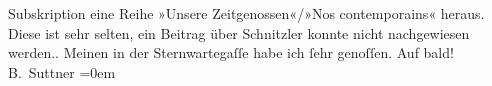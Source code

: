 \begin{ledgroupsized}[t]{13cm}
{{{                        Subskription eine Reihe »Unsere Zeitgenossen«/»Nos contemporains« heraus.
                        Diese ist sehr selten, ein Beitrag über Schnitzler konnte nicht nachgewiesen werden.}}}\label{K_L02156_2h}.\pend
           \pstart
           Meinen \label{K_L02156_3v}\label{K_L02156_3h} in der Sternwartegaſſe habe ich ſehr
                    genoſſen.\pend
           \pstart
           Auf bald!{\\[\baselineskip]}\spacefill\mbox{B. Suttner}\pend
           \leftskip=0em{}\endnumbering{}\end{ledgroupsized}  \newcommand{\dateiname}{L02156}\newcommand{\titel}{Bertha von Suttner an Arthur Schnitzler, 4. 11. 1913}\newcommand{\editorInnen}{Martin Anton Müller und Gerd-Hermann Susen}
      